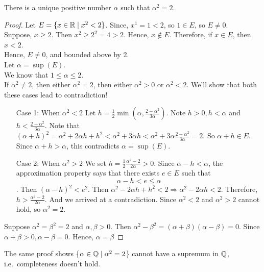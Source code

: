 \documentclass[11pt]{article}
\begin{document}
\begin{theorem}
    There is a unique positive number \(\alpha\) such that \(\alpha^2 = 2\).
\end{theorem}

\begin{proof}
    Let \(E = \{x \in \mathbb R \mid x^2 < 2\}\). Since, \(x^1 = 1 < 2\), so \(1 \in E\), so \(E \neq 0\). \\
    Suppose, \(x \geqslant 2\). Then \(x^2 \geqslant 2^2 = 4 > 2\). Hence, \(x \notin E\).
    Therefore, if \(x \in E\), then \(x < 2\). \\
    Hence, \(E \neq 0\), and bounded above by 2. \\
    Let \(\alpha = \sup(E)\). \\
    We know that \(1 \leqslant \alpha \leqslant 2\). \\
    If \(\alpha^2 \neq 2\), then either \(\alpha^2 = 2\), then either \(\alpha^2 > 0\) or \(\alpha^2 < 2\). We'll show that both these cases lead to contradiction!
    \begin{itemize}
        \item[Case 1:] When \(\alpha^2 < 2\) Let \(h = \frac{1}{2} \min(\alpha, \frac{2 -
                \alpha^2}{3\alpha})\). Note \(h > 0, h < \alpha\) and \(h < \frac{2
                -\alpha^2}{3\alpha}\). Note that \((\alpha + h)^2 = \alpha^2 + 2\alpha h + h^2
            < \alpha^2 + 3\alpha h < \alpha^2 + 3\alpha \frac{2 - \alpha^2}{3\alpha} = 2\).
            So \(\alpha + h \in E\). Since \(\alpha + h > \alpha\), this contradicts
            \(\alpha = \sup(E)\).
        \item[Case 2:] When \(\alpha^2 > 2\) We set \(h = \frac{1}{2} \frac{\alpha^2 -
                2}{2\alpha} > 0\). Since \(\alpha - h < \alpha\), the approximation property
            says that there exists \(e \in E\) such that \[\alpha - h < e \leqslant \alpha\]. Then \((\alpha - h)^2 < e^2\). Then \(\alpha^2 - 2\alpha h + h^2 < 2 \Rightarrow \alpha^2 - 2\alpha h < 2\). Therefore, \(h > \frac{\alpha^2 - 2}{2\alpha}\). And we arrived at a contradiction. Since \(\alpha^2 < 2\) and \(\alpha^2 > 2\) cannot hold, so \(\alpha^2 = 2\).
    \end{itemize}
    Suppose \(\alpha^2 = \beta^2 = 2\) and \(\alpha, \beta > 0\). Then \(\alpha^2 - \beta^2 = (\alpha + \beta)(\alpha - \beta) = 0\). Since \(\alpha + \beta > 0, \alpha - \beta = 0 \). Hence, \(\alpha = \beta\)
\end{proof}

\begin{remark}
    The same proof shows \{\(\alpha \in \mathbb Q \mid \alpha^2 = 2\)\} cannot have a supremum in \(\mathbb Q\), i.e.\ completeness doesn't hold.
\end{remark}
\end{document}
